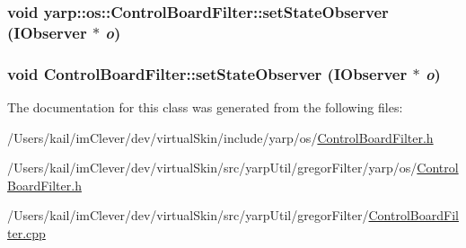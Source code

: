 \label{classyarp_1_1os_1_1_control_board_filter_acf3896d97b179e36d41d275087c33c4e}
\hypertarget{classyarp_1_1os_1_1_control_board_filter_a17305fdd2e2f51d790e5787245471eb9}{
\subsubsection[{setStateObserver}]{\setlength{\rightskip}{0pt plus 5cm}void yarp::os::ControlBoardFilter::setStateObserver ({\bf IObserver} $\ast$ {\em o})}}
\label{classyarp_1_1os_1_1_control_board_filter_a17305fdd2e2f51d790e5787245471eb9}
\hypertarget{classyarp_1_1os_1_1_control_board_filter_af23fad9bab89b2a57c4fb32eb99d76ef}{
\subsubsection[{setStateObserver}]{\setlength{\rightskip}{0pt plus 5cm}void ControlBoardFilter::setStateObserver ({\bf IObserver} $\ast$ {\em o})}}
\label{classyarp_1_1os_1_1_control_board_filter_af23fad9bab89b2a57c4fb32eb99d76ef}


The documentation for this class was generated from the following files:\begin{DoxyCompactItemize}
\item 
/Users/kail/imClever/dev/virtualSkin/include/yarp/os/\hyperlink{include_2yarp_2os_2_control_board_filter_8h}{ControlBoardFilter.h}\item 
/Users/kail/imClever/dev/virtualSkin/src/yarpUtil/gregorFilter/yarp/os/\hyperlink{src_2yarp_util_2gregor_filter_2yarp_2os_2_control_board_filter_8h}{ControlBoardFilter.h}\item 
/Users/kail/imClever/dev/virtualSkin/src/yarpUtil/gregorFilter/\hyperlink{_control_board_filter_8cpp}{ControlBoardFilter.cpp}\end{DoxyCompactItemize}

